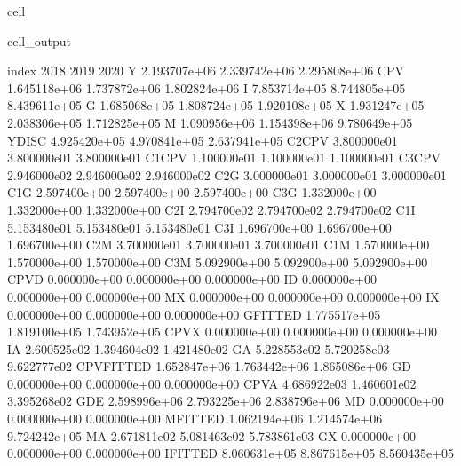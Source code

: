 \documentclass[letterpaper,10pt,english]{jupyterBook}
\begin{document}
\begin{sphinxuseclass}{cell}
\begin{sphinxVerbatimOutput}
\begin{sphinxuseclass}{cell_output}
\begin{sphinxVerbatim}[commandchars=\\\{\}]
index               2018          2019          2020  
Y           2.193707e+06  2.339742e+06  2.295808e+06  
CPV         1.645118e+06  1.737872e+06  1.802824e+06  
I           7.853714e+05  8.744805e+05  8.439611e+05  
G           1.685068e+05  1.808724e+05  1.920108e+05  
X           1.931247e+05  2.038306e+05  1.712825e+05  
M           1.090956e+06  1.154398e+06  9.780649e+05  
YDISC       4.925420e+05  4.970841e+05  2.637941e+05  
C2\PYGZus{}CPV      3.800000e\PYGZhy{}01  3.800000e\PYGZhy{}01  3.800000e\PYGZhy{}01  
C1\PYGZus{}CPV     \PYGZhy{}1.100000e\PYGZhy{}01 \PYGZhy{}1.100000e\PYGZhy{}01 \PYGZhy{}1.100000e\PYGZhy{}01  
C3\PYGZus{}CPV      2.946000e\PYGZhy{}02  2.946000e\PYGZhy{}02  2.946000e\PYGZhy{}02  
C2\PYGZus{}G        3.000000e\PYGZhy{}01  3.000000e\PYGZhy{}01  3.000000e\PYGZhy{}01  
C1\PYGZus{}G       \PYGZhy{}2.597400e+00 \PYGZhy{}2.597400e+00 \PYGZhy{}2.597400e+00  
C3\PYGZus{}G        1.332000e+00  1.332000e+00  1.332000e+00  
C2\PYGZus{}I        2.794700e\PYGZhy{}02  2.794700e\PYGZhy{}02  2.794700e\PYGZhy{}02  
C1\PYGZus{}I       \PYGZhy{}5.153480e\PYGZhy{}01 \PYGZhy{}5.153480e\PYGZhy{}01 \PYGZhy{}5.153480e\PYGZhy{}01  
C3\PYGZus{}I        1.696700e+00  1.696700e+00  1.696700e+00  
C2\PYGZus{}M        3.700000e\PYGZhy{}01  3.700000e\PYGZhy{}01  3.700000e\PYGZhy{}01  
C1\PYGZus{}M       \PYGZhy{}1.570000e+00 \PYGZhy{}1.570000e+00 \PYGZhy{}1.570000e+00  
C3\PYGZus{}M        5.092900e+00  5.092900e+00  5.092900e+00  
CPV\PYGZus{}D       0.000000e+00  0.000000e+00  0.000000e+00  
I\PYGZus{}D         0.000000e+00  0.000000e+00  0.000000e+00  
M\PYGZus{}X         0.000000e+00  0.000000e+00  0.000000e+00  
I\PYGZus{}X         0.000000e+00  0.000000e+00  0.000000e+00  
G\PYGZus{}FITTED    1.775517e+05  1.819100e+05  1.743952e+05  
CPV\PYGZus{}X       0.000000e+00  0.000000e+00  0.000000e+00  
I\PYGZus{}A        \PYGZhy{}2.600525e\PYGZhy{}02 \PYGZhy{}1.394604e\PYGZhy{}02 \PYGZhy{}1.421480e\PYGZhy{}02  
G\PYGZus{}A        \PYGZhy{}5.228553e\PYGZhy{}02 \PYGZhy{}5.720258e\PYGZhy{}03  9.622777e\PYGZhy{}02  
CPV\PYGZus{}FITTED  1.652847e+06  1.763442e+06  1.865086e+06  
G\PYGZus{}D         0.000000e+00  0.000000e+00  0.000000e+00  
CPV\PYGZus{}A      \PYGZhy{}4.686922e\PYGZhy{}03 \PYGZhy{}1.460601e\PYGZhy{}02 \PYGZhy{}3.395268e\PYGZhy{}02  
GDE         2.598996e+06  2.793225e+06  2.838796e+06  
M\PYGZus{}D         0.000000e+00  0.000000e+00  0.000000e+00  
M\PYGZus{}FITTED    1.062194e+06  1.214574e+06  9.724242e+05  
M\PYGZus{}A         2.671811e\PYGZhy{}02 \PYGZhy{}5.081463e\PYGZhy{}02  5.783861e\PYGZhy{}03  
G\PYGZus{}X         0.000000e+00  0.000000e+00  0.000000e+00  
I\PYGZus{}FITTED    8.060631e+05  8.867615e+05  8.560435e+05  
\end{sphinxVerbatim}

\end{sphinxuseclass}\end{sphinxVerbatimOutput}

\end{sphinxuseclass}
\end{document}
